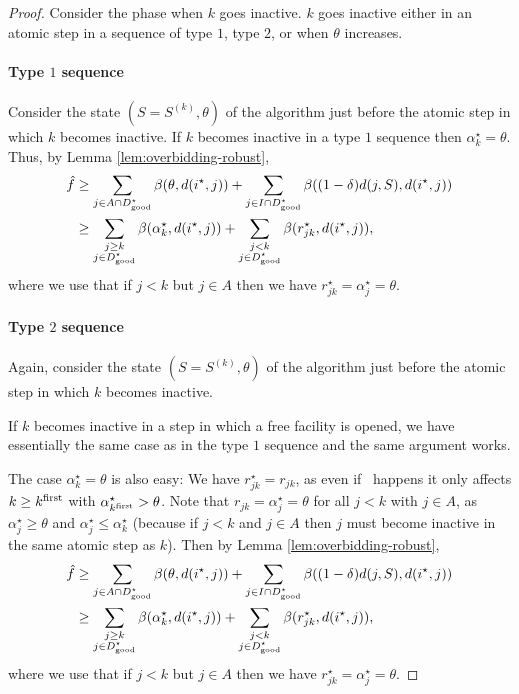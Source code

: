 \begin{proof}
    Consider the phase when $k$ goes inactive. 
    $k$ goes inactive either in an atomic step in a sequence of type $1$, type $2$, or when $\theta$ increases.
    \paragraph{Type $1$ sequence}
    Consider the state $(S=S^{(k)},\theta)$ of the algorithm just before the atomic step in which $k$ becomes inactive.
    If $k$ becomes inactive in a type $1$ sequence then $\alpha^\star_k = \theta$. Thus, by Lemma \ref{lem:overbidding-robust},
    \begin{align*}
        \hat f & \ge \sum_{j \in A \cap D^\star_{\mathrm{good}}} \beta(\theta, d(i^\star,j)) + \sum_{j \in I \cap D^\star_{\mathrm{good}}} \beta((1-\delta)d(j, S), d(i^\star,j)) 
        \\ & \ge \sum_{\substack{j \ge k\\ j \in D^\star_{\mathrm{good}}}} \beta(\alpha^\star_k, d(i^\star,j)) + \sum_{\substack{j < k\\ j \in D^\star_{\mathrm{good}}}} \beta(r^\star_{jk}, d(i^\star,j)),
    \end{align*}
    where we use that if $j < k$ but $j \in A$ then we have $r^\star_{jk} = \alpha_j^\star = \theta$.
    \paragraph{Type $2$ sequence}
    Again, consider the state $(S= S^{(k)},\theta)$ of the algorithm just before the atomic step in which $k$ becomes inactive.
    
    If $k$ becomes inactive in a step in which a free facility is opened, we have essentially the same case as in the type $1$ sequence and the same argument works.
    
    The case $\alpha_k^\star = \theta$ is also easy:
    We have $r_{jk}^\star = r_{jk}$, as even if \specialevent\ happens it only affects $k \geq k^{\mathrm{first}}$ with $\alpha^\star_{k^{\mathrm{first}}} > \theta$.
    Note that $r_{jk} = \alpha_j^\star = \theta$ for all $j < k$ with $j \in A$, as $\alpha_j^\star \geq \theta$ and $\alpha_j^\star \leq \alpha_k^\star$ (because if $j < k$ and $j \in A$ then $j$ must become inactive in the same atomic step as $k$).
    Then by Lemma \ref{lem:overbidding-robust},
    \begin{align*}
        \hat f & \ge \sum_{j \in A \cap D^\star_{\mathrm{good}}} \beta(\theta, d(i^\star,j)) + \sum_{j \in I\cap D^\star_{\mathrm{good}}} \beta((1-\delta)d(j, S), d(i^\star,j)) 
        \\ & \ge \sum_{\substack{j \ge k\\ j \in D^\star_{\mathrm{good}}}} \beta(\alpha^\star_k, d(i^\star,j)) + \sum_{\substack{j < k\\ j \in D^\star_{\mathrm{good}}}} \beta(r^\star_{jk}, d(i^\star,j)),
    \end{align*}
    where we use that if $j < k$ but $j \in A$ then we have $r^\star_{jk} = \alpha_j^\star = \theta$.
    

\end{proof}
